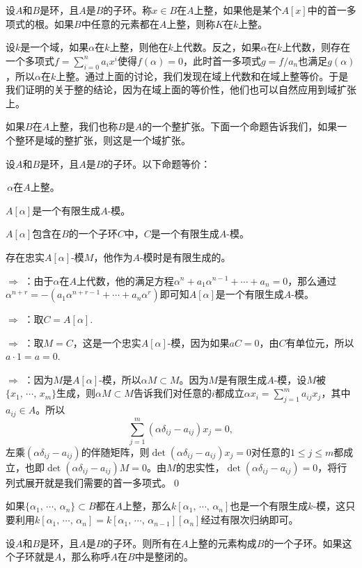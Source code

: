 \para 设$A$和$B$是环，且$A$是$B$的子环。称$x\in B$在$A$上整，如果他是某个$A[x]$中的首一多项式的根。如果$B$中任意的元素都在$A$上整，则称$K$在$k$上整。

设$k$是一个域，如果$\alpha$在$k$上整，则他在$k$上代数。反之，如果$\alpha$在$k$上代数，则存在一个多项式$f=\sum_{i=0}^na_ix^i$使得$f(\alpha)=0$，此时首一多项式$g=f/a_n$也满足$g(\alpha)$，所以$\alpha$在$k$上整。通过上面的讨论，我们发现在域上代数和在域上整等价。于是我们证明的关于整的结论，因为在域上面的等价性，他们也可以自然应用到域扩张上。

如果$B$在$A$上整，我们也称$B$是$A$的一个整扩张。下面一个命题告诉我们，如果一个整环是域的整扩张，则这是一个域扩张。

\pro 设$A$和$B$是环，且$A$是$B$的子环。以下命题等价：

	 $\,\alpha$在$A$上整。

	 $A[\alpha]$是一个有限生成$A$-模。

	 $A[\alpha]$包含在$B$的一个子环$C$中，$C$是一个有限生成$A$-模。

	 存在忠实$A[\alpha]$-模$M$，他作为$A$-模时是有限生成的。
	\label{p2:1}

\proof {} $\Rightarrow$  ：由于$\alpha$在$A$上代数，他的满足方程$\alpha^n+a_1\alpha^{n-1}+\cdots+a_n=0$，那么通过$\alpha^{n+r}=-(a_1\alpha^{n+r-1}+\cdots+a_n\alpha^r)$即可知$A[\alpha]$是一个有限生成$A$-模。

	 $\Rightarrow$  ：取$C=A[\alpha]$.

	 $\Rightarrow$  ：取$M=C$，这是一个忠实$A[\alpha]$-模，因为如果$aC=0$，由$C$有单位元，所以$a\cdot 1=a=0$.

	 $\Rightarrow$  ：因为$M$是$A[\alpha]$-模，所以$\alpha M\subset M$。因为$M$是有限生成$A$-模，设$M$被$\{x_1,\,\cdots,\,x_m\}$生成，则$\alpha M\subset M$告诉我们对任意的$i$都成立$\alpha x_i=\sum_{j=1}^m a_{ij} x_j$，其中$a_{ij}\in A$。所以
	\[
		\sum_{j=1}^m (\alpha\delta_{ij} -a_{ij})x_j=0,
	\]
	左乘$(\alpha\delta_{ij} -a_{ij})$的伴随矩阵，则$\det(\alpha\delta_{ij} -a_{ij})x_j=0$对任意的$1\leq j \leq m$都成立，也即$\det(\alpha\delta_{ij} -a_{ij})M=0$。由$M$的忠实性，$\det(\alpha\delta_{ij} -a_{ij})=0$，将行列式展开就是我们需要的首一多项式。\qed

如果$\{\alpha_1,\,\cdots,\,\alpha_n\}\subset B$都在$A$上整，那么$k[\alpha_1,\,\cdots,\,\alpha_n]$也是一个有限生成$k$-模，这只要利用$k[\alpha_1,\,\cdots,\,\alpha_n]=k[\alpha_1,\,\cdots,\,\alpha_{n-1}][\alpha_n]$经过有限次归纳即可。

\para 设$A$和$B$是环，且$A$是$B$的子环。则所有在$A$上整的元素构成$B$的一个子环。如果这个子环就是$A$，那么称呼$A$在$B$中是整闭的。


